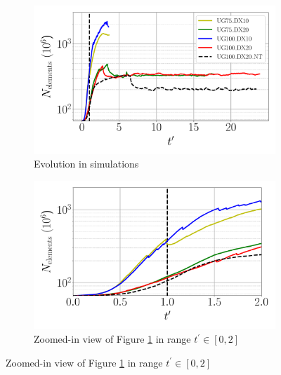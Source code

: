  

\begin{figure}[ht]
\flushleft
\begin{subfigure}[b]{0.45\textwidth}
	\centering
   \includegraphics[scale=0.24]{./part2_developments/figures_ch5_resolved_JICF/JICF_nelem_evolution/JICF_nelem_increase}
   \vspace*{-0.25in}
   \caption{Evolution in simulations}
   \label{fig:JICF_nelem_increase_all_t} 
\end{subfigure}
\hfill
\begin{subfigure}[b]{0.45\textwidth}
	\centering
   \includegraphics[scale=0.24]{./part2_developments/figures_ch5_resolved_JICF/JICF_nelem_evolution/JICF_nelem_increase_t_in_0_2}
   \vspace*{-0.25in}
   \caption{Zoomed-in view of Figure \ref{fig:JICF_nelem_increase_all_t} in range $t^{\prime} \in [0, 2]$}
   \label{fig:JICF_nelem_increase_t_0_to_2}
\end{subfigure}


\end{figure}
